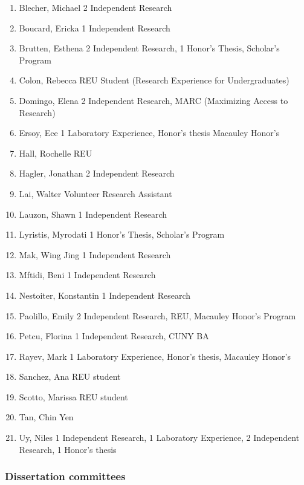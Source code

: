\documentclass[11pt,a4paper,]{moderncv}
\providecommand{\tightlist}{%
	\setlength{\itemsep}{0pt}\setlength{\parskip}{0pt}}
\begin{document}
\begin{enumerate}
\def\labelenumi{\arabic{enumi}.}
\tightlist
\item
  Blecher, Michael 2 Independent Research
\item
  Boucard, Ericka 1 Independent Research
\item
  Brutten, Esthena 2 Independent Research, 1 Honor's Thesis, Scholar's Program
\item
  Colon, Rebecca REU Student (Research Experience for Undergraduates)
\item
  Domingo, Elena 2 Independent Research, MARC (Maximizing Access to Research)
\item
  Ersoy, Ece 1 Laboratory Experience, Honor's thesis Macauley Honor's
\item
  Hall, Rochelle REU
\item
  Hagler, Jonathan 2 Independent Research
\item
  Lai, Walter Volunteer Research Assistant
\item
  Lauzon, Shawn 1 Independent Research
\item
  Lyristis, Myrodati 1 Honor's Thesis, Scholar's Program
\item
  Mak, Wing Jing 1 Independent Research
\item
  Mftidi, Beni 1 Independent Research
\item
  Nestoiter, Konstantin 1 Independent Research
\item
  Paolillo, Emily 2 Independent Research, REU, Macauley Honor's Program
\item
  Petcu, Florina 1 Independent Research, CUNY BA
\item
  Rayev, Mark 1 Laboratory Experience, Honor's thesis, Macauley Honor's
\item
  Sanchez, Ana REU student
\item
  Scotto, Marissa REU student
\item
  Tan, Chin Yen
\item
  Uy, Niles 1 Independent Research, 1 Laboratory Experience, 2 Independent Research, 1 Honor's thesis
\end{enumerate}

\hypertarget{dissertation-committees}{%
\subsubsection{Dissertation committees}\label{dissertation-committees}}
\end{document}
